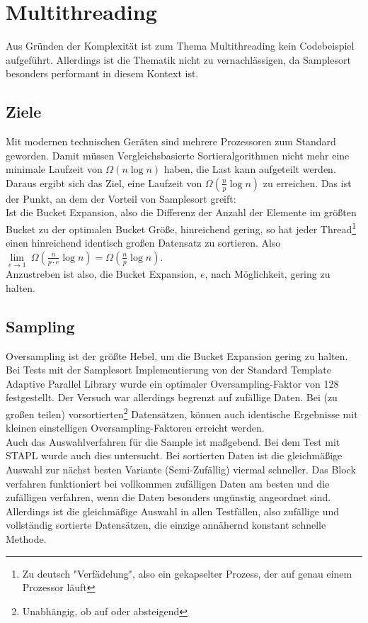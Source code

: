 \section{Multithreading}\label{sec:multithreading}
	Aus Gründen der Komplexität ist zum Thema Multithreading kein Codebeispiel aufgeführt.
	Allerdings ist die Thematik nicht zu vernachlässigen, da Samplesort besonders performant in diesem Kontext ist.
	
	\subsection{Ziele}
		Mit modernen technischen Geräten sind mehrere Prozessoren zum Standard geworden.
		Damit müssen Vergleichsbasierte Sortieralgorithmen nicht mehr eine minimale Laufzeit von $\Omega(n\log{n})$ haben, die Last kann aufgeteilt werden.
		Daraus ergibt sich das Ziel, eine Laufzeit von $\Omega\left(\frac{n}{p}\log{n}\right)$ zu erreichen.
		Das ist der Punkt, an dem der Vorteil von Samplesort greift:\\
		Ist die Bucket Expansion, also die Differenz der Anzahl der Elemente im größten Bucket zu der optimalen Bucket Größe, hinreichend gering, so hat jeder Thread\footnote{Zu deutsch "Verfädelung", also ein gekapselter Prozess, der auf genau einem Prozessor läuft} einen hinreichend identisch großen Datensatz zu sortieren.
		Also $\underset{e\to 1}{\overline\lim}\ \Omega\left(\frac{n}{p\cdot e}\log{n}\right)=\Omega\left(\frac{n}{p}\log{n}\right)$.\\
		Anzustreben ist also, die Bucket Expansion, $e$, nach Möglichkeit, gering zu halten.
		
	\subsection{Sampling}
		Oversampling ist der größte Hebel, um die Bucket Expansion gering zu halten.
		Bei Tests mit der Samplesort Implementierung von der Standard Template Adaptive Parallel Library \autocite{berlin-2007} wurde ein optimaler Oversampling-Faktor von 128 festgestellt.
		Der Versuch war allerdings begrenzt auf zufällige Daten.
		Bei (zu großen teilen) vorsortierten\footnote{Unabhängig, ob auf oder absteigend} Datensätzen, können auch identische Ergebnisse mit kleinen einstelligen Oversampling-Faktoren erreicht werden.\\
		Auch das Auswahlverfahren für die Sample ist maßgebend.
		Bei dem Test mit STAPL wurde auch dies untersucht.
		Bei sortierten Daten ist die gleichmäßige Auswahl zur nächst besten Variante (Semi-Zufällig) viermal schneller.
		Das Block verfahren funktioniert bei vollkommen zufälligen Daten am besten und die zufälligen verfahren, wenn die Daten besonders ungünstig angeordnet sind.
		Allerdings ist die gleichmäßige Auswahl in allen Testfällen, also zufällige und vollständig sortierte Datensätzen, die einzige annähernd konstant schnelle Methode.
		
